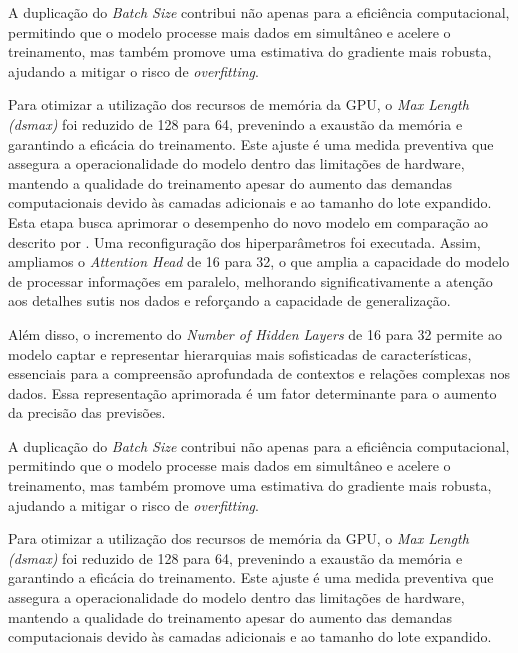 A duplicação do \textit{Batch Size} contribui não apenas para a eficiência computacional, permitindo que o modelo processe mais dados em simultâneo e acelere o treinamento, mas também promove uma estimativa do gradiente mais robusta, ajudando a mitigar o risco de \textit{overfitting}.

Para otimizar a utilização dos recursos de memória da GPU, o \textit{Max Length (dsmax)} foi reduzido de 128 para 64, prevenindo a exaustão da memória e garantindo a eficácia do treinamento. Este ajuste é uma medida preventiva que assegura a operacionalidade do modelo dentro das limitações de hardware, mantendo a qualidade do treinamento apesar do aumento das demandas computacionais devido às camadas adicionais e ao tamanho do lote expandido.
Esta etapa busca aprimorar o desempenho do novo modelo em comparação ao descrito por \textcite{Reynald}. Uma reconfiguração dos hiperparâmetros foi executada. Assim, ampliamos o \textit{Attention Head} de 16 para 32, o que amplia a capacidade do modelo de processar informações em paralelo, melhorando significativamente a atenção aos detalhes sutis nos dados e reforçando a capacidade de generalização.

Além disso, o incremento do \textit{Number of Hidden Layers} de 16 para 32 permite ao modelo captar e representar hierarquias mais sofisticadas de características, essenciais para a compreensão aprofundada de contextos e relações complexas nos dados. Essa representação aprimorada é um fator determinante para o aumento da precisão das previsões.

A duplicação do \textit{Batch Size} contribui não apenas para a eficiência computacional, permitindo que o modelo processe mais dados em simultâneo e acelere o treinamento, mas também promove uma estimativa do gradiente mais robusta, ajudando a mitigar o risco de \textit{overfitting}.

Para otimizar a utilização dos recursos de memória da GPU, o \textit{Max Length (dsmax)} foi reduzido de 128 para 64, prevenindo a exaustão da memória e garantindo a eficácia do treinamento. Este ajuste é uma medida preventiva que assegura a operacionalidade do modelo dentro das limitações de hardware, mantendo a qualidade do treinamento apesar do aumento das demandas computacionais devido às camadas adicionais e ao tamanho do lote expandido.

